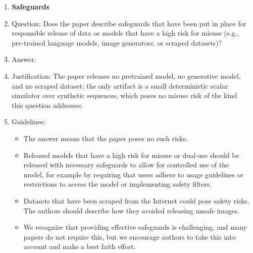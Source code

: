 \begin{enumerate}
\item {\bf Safeguards}
    \item[] Question: Does the paper describe safeguards that have been put in place for responsible release of data or models that have a high risk for misuse (e.g., pre-trained language models, image generators, or scraped datasets)?
    \item[] Answer: \answerNA{}
    \item[] Justification: The paper releases no pretrained model, no generative model, and no scraped dataset; the only artifact is a small deterministic scalar simulator over synthetic sequences, which poses no misuse risk of the kind this question addresses.
    \item[] Guidelines:
    \begin{itemize}
        \item The answer \answerNA{} means that the paper poses no such risks.
        \item Released models that have a high risk for misuse or dual-use should be released with necessary safeguards to allow for controlled use of the model, for example by requiring that users adhere to usage guidelines or restrictions to access the model or implementing safety filters.
        \item Datasets that have been scraped from the Internet could pose safety risks. The authors should describe how they avoided releasing unsafe images.
        \item We recognize that providing effective safeguards is challenging, and many papers do not require this, but we encourage authors to take this into account and make a best faith effort.
    \end{itemize}


\end{enumerate}
